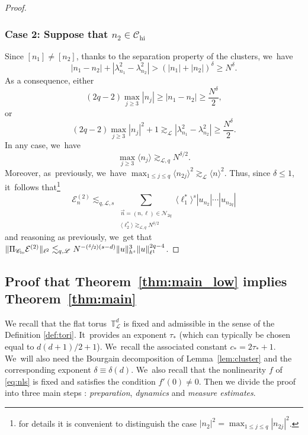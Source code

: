 \documentclass[10pt,a4paper]{amsart}
\newcommand{\Psfrac}[2]{(\sfrac{#1}{#2})}
\theoremstyle{plain}
\theoremstyle{definition}
\DeclareMathOperator{\hi}{hi}
\DeclareMathOperator{\lo}{lo}
\newcommand{\1}{\mathbf{1}}
\newcommand{\Clo}{\mathscr{C}_{\lo}}
\newcommand{\Chigh}{\mathscr{C}_{\hi}}
\begin{document}
\begin{proof}
\subsubsection*{Case 2: Suppose that $n_2 \in \Chigh$}
Since $[n_1] \neq [n_2]$, thanks to the separation property of the clusters, we~have
\[
|n_1-n_2| + |\lambda_{n_{1}}^{2}-\lambda_{n_{2}}^{2}| > (|n_1|+|n_2|)^{\delta} \geq N^{\delta}.
\]
As a consequence, either\vspace*{-3pt}
\[
(2q-2) \max_{j\geq 3} |n_j| \geq |n_1-n_2| \geq \frac{N^{\delta}}2,
\]
or\vspace*{-3pt}
\[
(2q-2) \max_{j\geq 3} |n_j|^2 + 1 \gtrsim_{\mathscr{L}} |\lambda_{n_{1}}^{2}-\lambda_{n_{2}}^{2}| \geq \frac{N^{\delta}}2.
\]
In any case, we~have
\[
\max_{j\geq 3} \langle n_j \rangle \gtrsim_{\mathscr{L},q} N^{\delta/2}.
\]
Moreover, as~previously, we~have $\max_{1\leq j \leq q} \langle n_{2j} \rangle^2 \gtrsim_{\mathscr{L}} \langle n\rangle^2$. Thus,
since $\delta \leq 1$, it~follows that\footnote{for details it is convenient to distinguish the case $|n_2|^2=\max_{1\leq j \leq q} |n_{2j}|^2$.}
\[
\mathcal{E}^{(2)}_n \lesssim_{q,\mathscr{L},s} \sum_{\substack{\vec{n}=(n,\ell)\in\mathcal{N}_{2q} \\ \langle \ell_2^* \rangle \gtrsim_{\mathscr{L},q} N^{\delta/2} }} \langle \ell_1^\ast \rangle^{s} |u_{n_{2}}|\cdots|u_{n_{2q}}|
\]
and reasoning as previously, we~get that
$\| \Pi_{\Clo} \mathcal{E}^{(2)} \|_{\ell^2} \lesssim_{q,\mathscr{L}} N^{-\Psfrac{\delta}2(s-d)}\|u\|_{h^{s}}^{3}\|u\|_{\ell^{1}}^{2q-4}$.
\end{proof}

\subsection{Proof that Theorem~\ref{thm:main_low} implies Theorem~\ref{thm:main}}
\label{sub:a-b}

We recall that the flat torus~$\mathbb{T}^d_{\mathscr{L}}$ is fixed and admissible in the sense of the Definition \ref{def:tori}. It~provides an exponent $\tau_\ast$ (which can typically be chosen equal to $d(d+1)/2+1$). We~recall the associated constant $c_\ast = 2 \tau_\ast+1$. We~will also need the Bourgain decomposition of Lemma~\ref{lem:cluster} and the corresponding exponent $\delta \equiv \delta(d)$. We~also recall that the nonlinearity $f$ of \eqref{eq:nls} is fixed and satisfies the condition $f'(0) \neq 0$. Then we divide the proof into three main steps : \emph{preparation}, \emph{dynamics} and \emph{measure estimates}.
\end{document}
